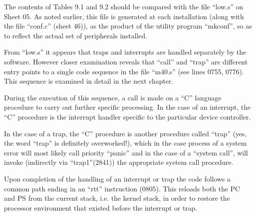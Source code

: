 The contents of Tables 9.1 and 9.2
should be compared with the file
``low.s'' on Sheet 05. As noted earlier,
this file is generated at each installation (along with the file ``conf.c''
(sheet 46)), as the product of the
utility program ``mkconf'', so as to
reflect the actual set of peripherals
installed.



From ``low.s'' it appears that traps and
interrupts are handled separately by
the software. However closer examination reveals that ``call'' and ``trap'' are
different entry points to a single code
sequence in the file ``m40.s'' (see lines
0755, 0776). This sequence is examined
in detail in the next chapter.


During the execution of this sequence,
a call is made on a ``C'' language procedure to carry out further specific
processing. In the case of an interrupt, the ``C'' procedure
is the interrupt handler specific to the particular
device controller.

 In the case of a trap, the ``C'' procedure is another procedure called
 ``trap'' (yes, the word ``trap'' is definitely overworked!), which in the case
process of a system error will most likely call
priority ``panic'' and in the case of a ``system
 call'', will invoke (indirectly via
 ``trap1''(2841)) the appropriate system
 call procedure.


Upon completion of the handling of an
interrupt or trap the code follows a
common path ending in an ``rtt'' instruction (0805). This reloads both the PC
and PS from the current stack, i.e. the
kernel stack, in order to restore the
processor environment that existed
before the interrupt or trap.
